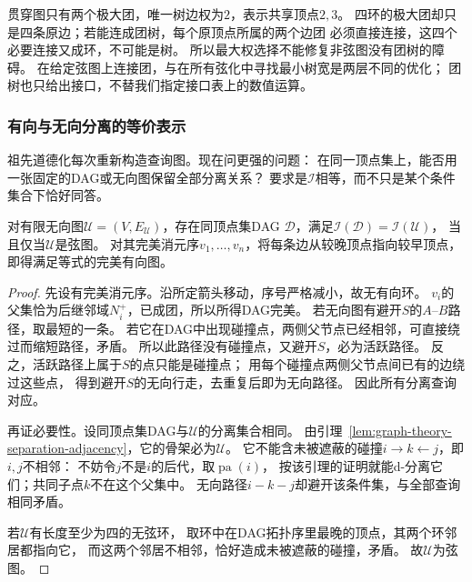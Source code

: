 贯穿图只有两个极大团，唯一树边权为\(2\)，表示共享顶点\(2,3\)。
四环的极大团却只是四条原边；若能连成团树，每个原顶点所属的两个边团
必须直接连接，这四个必要连接又成环，不可能是树。
所以最大权选择不能修复非弦图没有团树的障碍。
在给定弦图上连接团，与在所有弦化中寻找最小树宽是两层不同的优化；
团树也只给出接口，不替我们指定接口表上的数值运算。

\subsubsection{有向与无向分离的等价表示}
\label{sec:graph-theory-separation-correspondence}

祖先道德化每次重新构造查询图。现在问更强的问题：
在同一顶点集上，能否用一张固定的DAG或无向图保留全部分离关系？
要求是\(\mathcal I\)相等，而不只是某个条件集合下恰好同答。

\begin{theorem}[无向图的完美有向图表示]
  \label{thm:graph-theory-chordal-perfect}
  对有限无向图\(\mathcal U=(V,E_{\mathcal U})\)，存在同顶点集DAG
  \(\mathcal D\)，满足\(\mathcal I(\mathcal D)=\mathcal I(\mathcal U)\)，
  当且仅当\(\mathcal U\)是弦图。
  对其完美消元序\(v_1,\ldots,v_n\)，将每条边从较晚顶点指向较早顶点，
  即得满足等式的完美有向图。
\end{theorem}

\begin{proof}
先设有完美消元序。沿所定箭头移动，序号严格减小，故无有向环。
\(v_i\)的父集恰为后继邻域\(N_i^+\)，已成团，所以所得DAG完美。
若无向图有避开\(S\)的\(A\)--\(B\)路径，取最短的一条。
若它在DAG中出现碰撞点，两侧父节点已经相邻，可直接绕过而缩短路径，矛盾。
所以此路径没有碰撞点，又避开\(S\)，必为活跃路径。
反之，活跃路径上属于\(S\)的点只能是碰撞点；
用每个碰撞点两侧父节点间已有的边绕过这些点，
得到避开\(S\)的无向行走，去重复后即为无向路径。
因此所有分离查询对应。

再证必要性。设同顶点集DAG与\(\mathcal U\)的分离集合相同。
由引理~\ref{lem:graph-theory-separation-adjacency}，它的骨架必为\(\mathcal U\)。
它不能含未被遮蔽的碰撞\(i\to k\leftarrow j\)，即\(i,j\)不相邻：
不妨令\(j\)不是\(i\)的后代，取\(\operatorname{pa}(i)\)，
按该引理的证明就能d-分离它们；共同子点\(k\)不在这个父集中。
无向路径\(i-k-j\)却避开该条件集，与全部查询相同矛盾。

若\(\mathcal U\)有长度至少为四的无弦环，
取环中在DAG拓扑序里最晚的顶点，其两个环邻居都指向它，
而这两个邻居不相邻，恰好造成未被遮蔽的碰撞，矛盾。
故\(\mathcal U\)为弦图。
\end{proof}

